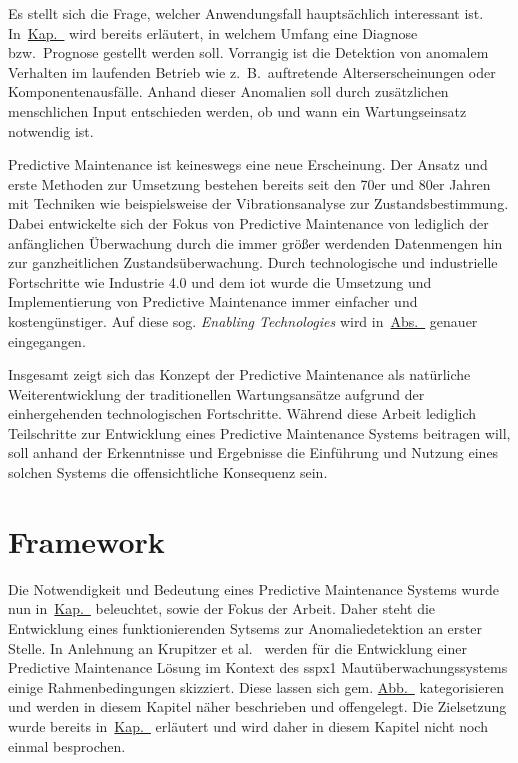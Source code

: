 Es stellt sich die Frage, welcher Anwendungsfall hauptsächlich interessant ist. In~\hyperref[ch:zielsetzung]{Kap.~}
wird bereits erläutert, in welchem Umfang eine Diagnose bzw.~Prognose gestellt werden soll. Vorrangig ist die Detektion von anomalem
Verhalten im laufenden Betrieb wie z.~B.~auftretende Alterserscheinungen oder Komponentenausfälle. Anhand dieser Anomalien soll durch
zusätzlichen menschlichen Input entschieden werden, ob und wann ein Wartungseinsatz notwendig ist.

Predictive Maintenance ist keineswegs eine neue Erscheinung. Der Ansatz und erste Methoden zur Umsetzung bestehen bereits seit den 70er
und 80er Jahren~\cite{Sandtorv1973, Renwick1985} mit Techniken wie beispielsweise der Vibrationsanalyse zur Zustandsbestimmung. Dabei
entwickelte sich der Fokus von Predictive Maintenance von lediglich der anfänglichen Überwachung durch die immer größer werdenden
Datenmengen hin zur ganzheitlichen Zustandsüberwachung. Durch technologische und industrielle Fortschritte wie Industrie 4.0 und dem
\ac{iot} wurde die Umsetzung und Implementierung von Predictive Maintenance immer einfacher und kostengünstiger. Auf diese sog.
\textit{Enabling Technologies} wird in~\hyperref[sec:technologische_grundlagen]{Abs.~} genauer
eingegangen.

Insgesamt zeigt sich das Konzept der Predictive Maintenance als natürliche Weiterentwicklung der traditionellen Wartungsansätze aufgrund
der einhergehenden technologischen Fortschritte. Während diese Arbeit lediglich Teilschritte zur Entwicklung eines Predictive Maintenance
Systems beitragen will, soll anhand der Erkenntnisse und Ergebnisse die Einführung und Nutzung eines solchen Systems die offensichtliche
Konsequenz sein.

\section{Framework}\label{sec:framework}
Die Notwendigkeit und Bedeutung eines Predictive Maintenance Systems wurde nun in~\hyperref[ch:pdm_theorie]{Kap.~}
beleuchtet, sowie der Fokus der Arbeit. Daher steht die Entwicklung eines funktionierenden Sytsems zur Anomaliedetektion an erster Stelle.
In Anlehnung an Krupitzer et al.~\cite{Krupitzer2020} werden für die Entwicklung einer Predictive Maintenance Lösung im Kontext des \ac{sspx1}
Mautüberwachungssystems einige Rahmenbedingungen skizziert. Diese lassen sich gem.
\hyperref[fig:pdm_framework]{Abb.~} kategorisieren und werden in diesem Kapitel näher beschrieben und offengelegt.
Die Zielsetzung wurde bereits in~\hyperref[ch:zielsetzung]{Kap.~} erläutert und wird daher in diesem Kapitel nicht
noch einmal besprochen.

